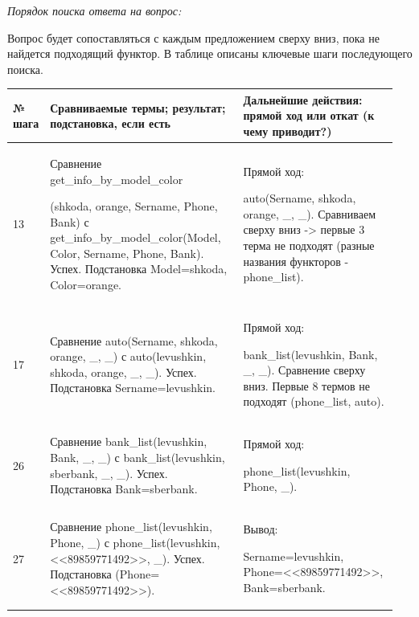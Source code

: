 \documentclass[a4paper,12pt]{article}
\begin{document}
	\textit{Порядок поиска ответа на вопрос:}
	
	Вопрос будет сопоставляться с каждым предложением сверху вниз, пока не
	найдется подходящий функтор. В таблице описаны ключевые шаги последующего поиска.
	
	\begin{center}
		\begin{longtable}[h!]{|p{0.05\linewidth}|p{0.5\linewidth}|p{ 0.4\linewidth}|}
				\hline
				{\bf  № шага} & {\bf Сравниваемые термы; результат; подстановка, если есть} & {\bf Дальнейшие действия: прямой ход или откат (к чему приводит?)} \\
				\hline
				{13} & {Сравнение get\_info\_by\_model\_color
				
					(shkoda, orange, Sername, Phone, Bank) с get\_info\_by\_model\_color(Model, Color, Sername, Phone, Bank). Успех. Подстановка Model=shkoda, Color=orange.} & {Прямой ход:
				
						auto(Sername, shkoda, orange, \_, \_). Сравниваем сверху вниз -> первые 3 терма не подходят (разные названия функторов - phone\_list).}\\
				\hline
				{17} & {Сравнение auto(Sername, shkoda, orange, \_, \_) с auto(levushkin, shkoda, orange, \_, \_). Успех. Подстановка Sername=levushkin.} & {Прямой ход:
				
					bank\_list(levushkin, Bank, \_, \_). Сравнение сверху вниз. Первые 8 термов не подходят (phone\_list, auto).}\\
				\hline
				{26} & {Сравнение bank\_list(levushkin, Bank, \_, \_) с bank\_list(levushkin, sberbank, \_, \_). Успех. Подстановка Bank=sberbank.} & {Прямой ход:
				
					phone\_list(levushkin, Phone, \_).}\\
				\hline
				{27} & {Сравнение phone\_list(levushkin, Phone, \_) с phone\_list(levushkin, <<89859771492>>, \_). Успех. Подстановка (Phone=<<89859771492>>).} & {Вывод:
				
					Sername=levushkin, Phone=<<89859771492>>, Bank=sberbank.
				
}
\end{longtable}
\end{center}
\end{document}
